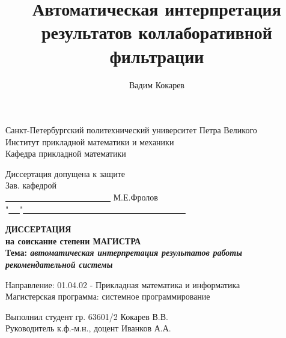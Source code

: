 \documentclass[12pt,a4paper]{report}
\author{Вадим Кокарев}
\title{Автоматическая интерпретация результатов коллаборативной фильтрации}
\begin{document}
\begin{titlepage}
\par

\begin{center}
{\large
Санкт-Петербургский политехнический университет  Петра Великого\\
Институт прикладной математики и механики\\
Кафедра прикладной математики\\

\vspace*{0.5cm}

\begin{flushright}
Диссертация допущена к защите\\
Зав. кафедрой\ \ \ \ \ \ \ \ \ \ \ \ \ \ \ \ \ \ \ \ \ \ \ \ \ \ \ \\
\underline{ \ \ \ \ \ \ \ \ \ \ \ \ \ \ \ \ \ \ \ \ \ \ \ \ \ } М.Е.Фролов\\
"\underline{ \ \ }"\underline{ \ \ \ \ \ \ \ \ \ \ \ \ \ \ \ \ \ \ \ \ \ \ \ \ \ \ \ \ \ \ \ \ \ \ \ \ \ \ }
\end{flushright}

\vspace*{2.0cm}

{\Large
  \textbf{
    ДИССЕРТАЦИЯ\\
    на соискание степени МАГИСТРА\\
  }
}
\vspace*{1cm}
\textbf{
  Тема: \emph{автоматическая интерпретация результатов работы рекомендательной системы}\\
}

}

\vspace*{1cm}

\begin{flushleft}
Направление: 01.04.02 - Прикладная математика и информатика\\
Магистерская программа: системное программирование\\
\end{flushleft}

\vspace*{0.2cm}

\begin{flushleft}
Выполнил студент гр. 63601/2 \hrulefill Кокарев В.В.\\
\vspace*{0.3cm}
Руководитель к.ф.-м.н., доцент \hrulefill Иванков А.А.\\
\vspace*{0.3cm}
\end{flushleft}
\vspace{0.2em} 


\end{center}
\end{titlepage}
\end{document}
